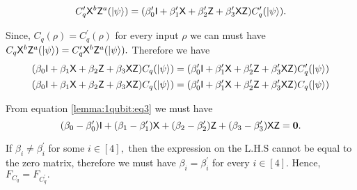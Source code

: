 \begin{equation}
\label{lemma:1qubit:eq2}
\begin{aligned}
 C_q^\prime {\sf X}^b {\sf Z}^a({\lvert}\psi\rangle)=(\beta_0^\prime {\sf I}+\beta_1^\prime {\sf X}+\beta_2^\prime {\sf Z}+\beta_3^\prime {\sf X} {\sf Z})  C_q^\prime ({\lvert}\psi\rangle).
 \end{aligned}
\end{equation}

Since,  $C_q (\rho)=C_q^\prime (\rho)$ for every input $\rho$ we can must have $C_q {\sf X}^b {\sf Z}^a({\lvert}\psi\rangle)= C_q^\prime {\sf X}^b {\sf Z}^a({\lvert}\psi\rangle).$ Therefore we have 
\begin{equation}
\label{lemma:1qubit:eq3}
\begin{aligned}
(\beta_0 {\sf I}+\beta_1 {\sf X}+\beta_2 {\sf Z}+\beta_3 {\sf X} {\sf Z})  C_q ({\lvert}\psi\rangle)=(\beta_0^\prime {\sf I}+\beta_1^\prime {\sf X}+\beta_2^\prime {\sf Z}+\beta_3^\prime {\sf X} {\sf Z})  C_q^\prime ({\lvert}\psi\rangle)\\
(\beta_0 {\sf I}+\beta_1 {\sf X}+\beta_2 {\sf Z}+\beta_3 {\sf X} {\sf Z})  C_q ({\lvert}\psi\rangle)=(\beta_0^\prime {\sf I}+\beta_1^\prime {\sf X}+\beta_2^\prime {\sf Z}+\beta_3^\prime {\sf X} {\sf Z})  C_q({\lvert}\psi\rangle)\\
\end{aligned}
\end{equation}


From equation \ref{lemma:1qubit:eq3} we must have
\begin{equation}
\label{lemma:1qubit:eq4}
(\beta_0-\beta_0^\prime) {\sf I}+(\beta_1 -\beta_1^\prime){\sf X}+(\beta_2-\beta_2^\prime) {\sf Z}+(\beta_3-\beta^\prime_3) {\sf X} {\sf Z}={\bf 0}.
\end{equation}

If $\beta_i \neq \beta_i^\prime$ for some $i\in[4],$ then the expression on the L.H.S cannot be equal to the zero matrix, therefore we must have $\beta_i = \beta_i^\prime$ for every $i\in[4].$ Hence,  $F_{C_q}=F_{C_q^\prime}.$






